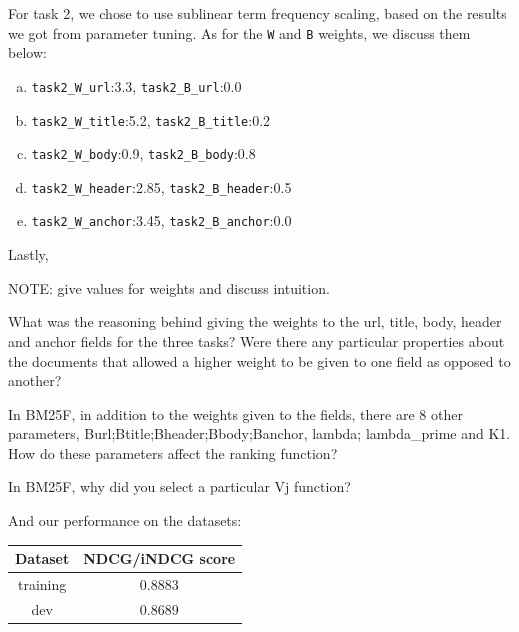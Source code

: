 \documentclass[10pt,twocolumn]{article}
\begin{document}
For task 2, we chose to use sublinear term frequency scaling, based on the results we got from parameter tuning. As for the \texttt{W} and \texttt{B} weights, we discuss them below:
\begin{enumerate}[(a)]
\item \texttt{task2\_W\_url}:3.3, \texttt{task2\_B\_url}:0.0

\item \texttt{task2\_W\_title}:5.2, \texttt{task2\_B\_title}:0.2

\item \texttt{task2\_W\_body}:0.9, \texttt{task2\_B\_body}:0.8

\item \texttt{task2\_W\_header}:2.85, \texttt{task2\_B\_header}:0.5

\item \texttt{task2\_W\_anchor}:3.45, \texttt{task2\_B\_anchor}:0.0

\end{enumerate}

Lastly, 


NOTE: give values for weights and discuss intuition.

What was the reasoning behind giving the weights to the url, title,
body, header and anchor fields for the three tasks? Were there any
particular properties about the documents that allowed a higher weight
to be given to one field as opposed to another?

In BM25F, in addition to the weights given to the fields, there are
8 other parameters, Burl;Btitle;Bheader;Bbody;Banchor, lambda; lambda\_prime and K1.
How do these parameters affect the ranking function?

In BM25F, why did you select a particular Vj function?

And our performance on the datasets:
\begin{table}[H]
\centering
\begin{tabular}{|c|c|}
\hline
Dataset & NDCG/iNDCG score \\\hline
training & 0.8883\\\hline
dev & 0.8689\\\hline
\end{tabular}
\end{table}
\end{document}
